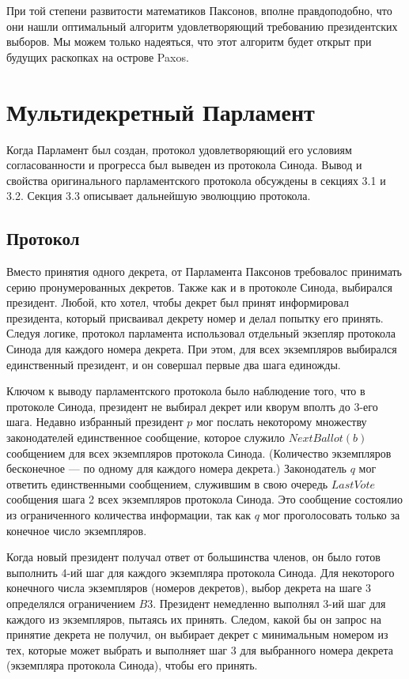 \documentclass[12pt, a4paper]{article} %
\begin{document}
При той степени развитости математиков Паксонов, вполне правдоподобно, что они нашли оптимальный алгоритм удовлетворяющий требованию президентских выборов. Мы можем только надеяться, что этот алгоритм будет открыт при будущих раскопках на острове Paxos.

\newpage
\section{Мультидекретный Парламент}

Когда Парламент был создан, протокол удовлетворяющий его условиям согласованности и прогресса был выведен из протокола Синода. Вывод и свойства оригинального парламентского протокола обсуждены в секциях 3.1 и 3.2. Секция 3.3 описывает дальнейшую эволюццию протокола.

\subsection{Протокол}

Вместо принятия одного декрета, от Парламента Паксонов требовалос принимать серию пронумерованных декретов. Также как и в протоколе Синода, выбирался президент. Любой, кто хотел, чтобы декрет был принят информировал президента, который присваивал декрету номер и делал попытку его принять. Следуя логике, протокол парламента использовал отдельный экзепляр протокола Синода для каждого номера декрета. При этом, для всех экземпляров выбирался единственный президент, и он совершал первые два шага единожды.

Ключом к выводу парламентского протокола было наблюдение того, что в протоколе Синода, президент не выбирал декрет или кворум вполть до 3-его шага. Недавно избранный президент $p$ мог послать некоторому множеству законодателей единственное сообщение, которое служило $NextBallot(b)$ сообщением для всех экземпляров протокола Синода. (Количество экземпляров бесконечное --- по одному для каждого номера декрета.) Законодатель $q$ мог ответить единственными сообщением, служившим в свою очередь $LastVote$ сообщения шага 2 всех экземпляров протокола Синода. Это сообщение состоялио из ограниченного количества информации, так как $q$ мог проголосовать только за конечное число экземпляров.

Когда новый президент получал ответ от большинства членов, он было готов выполнить 4-ий шаг для каждого экземпляра протокола Синода. Для некоторого конечного числа экземпляров (номеров декретов), выбор декрета на шаге 3 определялся ограничением $B3$. Президент немедленно выполнял 3-ий шаг для каждого из экземпляров, пытаясь их принять. Следом, какой бы он запрос на принятие декрета не получил, он выбирает декрет с минимальным номером из тех, которые может выбрать и выполняет шаг 3 для выбранного номера декрета (экземпляра протокола Синода), чтобы его принять.
\end{document}

